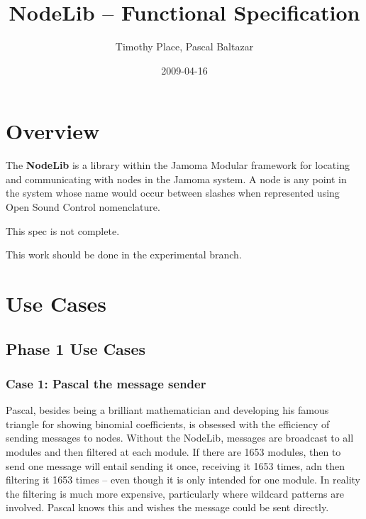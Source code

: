 \documentclass[]{article}
\title{NodeLib -- Functional Specification}
\author{ Timothy Place, Pascal Baltazar }
\date{2009-04-16}
\begin{document}
\ifpdf
{}
\else
{}
\fi

\maketitle


\begin{abstract}
\end{abstract}





\section{Overview}

The \textbf{NodeLib} is a library within the Jamoma Modular framework for locating and communicating with nodes in the Jamoma system.  A node is any point in the system whose name would occur between slashes when represented using Open Sound Control nomenclature.  

This spec is not complete.

This work should be done in the experimental branch.



\section{Use Cases}

\subsection{Phase 1 Use Cases}

\subsubsection{Case 1: Pascal the message sender}

Pascal, besides being a brilliant mathematician and developing his famous triangle for showing binomial coefficients, is obsessed with the efficiency of sending messages to nodes.  Without the NodeLib, messages are broadcast to all modules and then filtered at each module.  If there are 1653 modules, then to send one message will entail sending it once, receiving it 1653 times, adn then filtering it 1653 times -- even though it is only intended for one module.  In reality the filtering is much more expensive, particularly where wildcard patterns are involved.  Pascal knows this and wishes the message could be sent directly.
\end{document}
